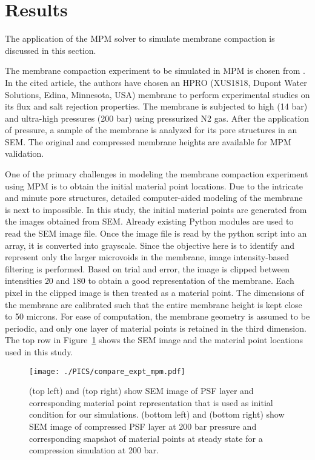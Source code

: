 \section{Results}
The application of the \Ex MPM solver to simulate membrane compaction is discussed in this section. 

The membrane compaction experiment to be simulated in MPM is chosen from \cite{WU2022115875}. In the cited article, the authors have chosen an HPRO (XUS1818, Dupont Water Solutions, Edina, Minnesota, USA) membrane to perform experimental studies on its flux and salt rejection properties. The membrane is subjected to high (14 bar) and ultra-high pressures (200 bar) using pressurized N2 gas. After the application of pressure, a sample of the membrane is analyzed for its pore structures in an SEM. The original and compressed membrane heights are available for MPM validation.

One of the primary challenges in modeling the membrane compaction experiment using MPM is to obtain the initial material point locations. Due to the intricate and minute pore structures, detailed computer-aided modeling of the membrane is next to impossible. In this study, the initial material points are generated  from the images obtained from SEM. Already existing Python modules are used to read the SEM image file. Once the image file is read by the python script into an array, it is converted into grayscale. Since the objective here is to identify and represent only the larger microvoids in the membrane, image intensity-based filtering is performed. Based on trial and error, the image is clipped between intensities $20$ and $180$ to obtain a good representation of the membrane. Each pixel in the clipped image is then treated as a material point. The dimensions of the membrane are calibrated such that the entire membrane height is kept close to 50 microns. For ease of computation, the membrane geometry is assumed to be periodic, and only one layer of material points is retained in the third dimension. The top row in Figure~\ref{fig:expt_mpm_compare} shows the SEM image and the material point locations used in this study.

\begin{figure}[tbh]
\texttt{[image: ./PICS/compare\_expt\_mpm.pdf]}
\caption{(top left) and (top right) show SEM image of PSF layer and corresponding material point representation that is used as initial condition for our simulations. (bottom left) and (bottom right) show SEM image of compressed PSF layer at 200 bar pressure and corresponding snapshot of material points at steady state for a compression simulation at 200 bar.}
\label{fig:expt_mpm_compare}
\end{figure}

